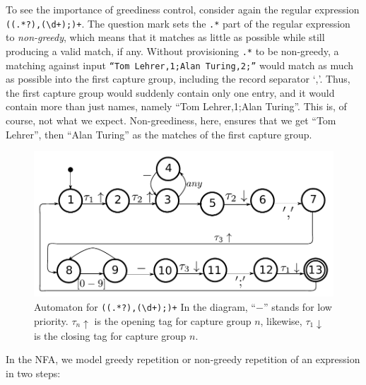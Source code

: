 \documentclass[11pt,a4paper,twoside,openright]{Thesis}
\theoremstyle{definition}
\begin{document}
To see the importance of greediness control, consider again the regular
expression \texttt{((.*?),(\textbackslash{}d+);)+}. The question
mark sets the \texttt{.*} part of the regular expression to
\emph{non-greedy}, which means that it matches as little as
possible while still producing a valid match, if any.  Without
provisioning \texttt{.*} to be non-greedy, a matching against input
\texttt{``Tom Lehrer,1;Alan Turing,2;''} would match as much as
possible into the first capture group, including the record separator
`,'.  Thus, the first capture group would suddenly contain only one
entry, and it would contain more than just names, namely ``Tom
Lehrer,1;Alan Turing''.  This is, of course, not what we expect.
Non-greediness, here, ensures that we get ``Tom Lehrer'', then
``Alan Turing'' as the matches of the first capture group.

\begin{figure}[htp]
\includegraphics[width=\linewidth]{graphs/lehrer_automaton}

\caption[NFA for \texttt{((.*?),(\textbackslash{}d+);)+}]{\label{fig:example-automaton}
Automaton for \texttt{((.*?),(\textbackslash{}d+);)+}
In the diagram, ``$-$'' stands for low priority. $\tau_n\uparrow$ is the
opening tag for capture group $n$, likewise, $\tau_1\downarrow$ is the closing
tag for capture group $n$.}
\end{figure}


In the NFA, we model greedy repetition or non-greedy repetition of
an expression in two steps:
\end{document}
